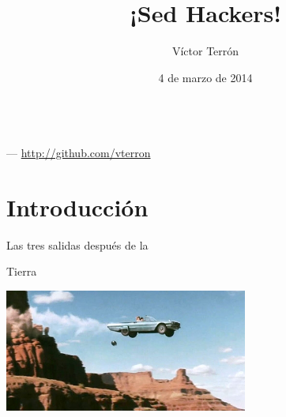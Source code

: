 \documentclass[14pt]{beamer}
\title{¡Sed Hackers!}
\author{Víctor Terrón}
\date{4 de marzo de 2014}
\institute{IAA-CSIC}
\begin{document}
{

\begin{frame}[plain]
  \vspace{6.25cm}
  \begin{TitleBox}
    {\LARGE \inserttitle} \\
    {\small \insertauthor \enspace --- \thinspace \url{http://github.com/vterron}}
  \end{TitleBox}
\end{frame}
}

\section{Introducción}
\begin{frame}{}
\begin{block}{}
    \centering \Large Las tres salidas después de la 
\end{block}
\end{frame}

\begin{frame}{Tierra}
  \begin{center}
    \includegraphics[width=0.6\textwidth]{pics/thelma-louise-cliff.jpg}
  \end{center}
\end{frame}
\end{document}
